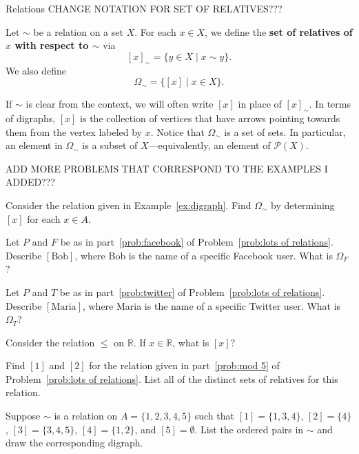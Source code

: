 \begin{section}{Relations}
CHANGE NOTATION FOR SET OF RELATIVES???

\begin{definition}\label{def:relatives}
Let $\sim$ be a relation on a set $X$. For each $x\in X$, we define the \textbf{set of relatives of $x$ with respect to $\sim$} via
\[
[x]_{\sim}=\{y\in X\mid x\sim y\}.
\]
We also define
\[
\Omega_{\sim}=\{[x]\mid x\in X\}.
\]
\end{definition}

If $\sim$ is clear from the context, we will often write $[x]$ in place of $[x]_{\sim}$.  In terms of digraphs, $[x]$ is the collection of vertices that have arrows pointing towards them from the vertex labeled by $x$. Notice that $\Omega_{\sim}$ is a set of sets.  In particular, an element in $\Omega_{\sim}$ is a subset of $X$---equivalently, an element of $\mathcal{P}(X)$.

ADD MORE PROBLEMS THAT CORRESPOND TO THE EXAMPLES I ADDED???

\begin{problem}
Consider the relation given in Example~\ref{ex:digraph}. Find $\Omega_{\sim}$ by determining $[x]$ for each $x\in A$.
\end{problem}

\begin{problem}
Let $P$ and $F$ be as in part~\ref{prob:facebook} of Problem~\ref{prob:lots of relations}.  Describe $[\text{Bob}]$, where Bob is the name of a specific Facebook user.  What is $\Omega_F$?
\end{problem}

\begin{problem}
Let $P$ and $T$ be as in part~\ref{prob:twitter} of Problem~\ref{prob:lots of relations}.  Describe $[\text{Maria}]$, where Maria is the name of a specific Twitter user.  What is $\Omega_T$?
\end{problem}

\begin{problem}
Consider the relation $\leq$ on $\mathbb{R}$.  If $x\in \mathbb{R}$, what is $[x]$?
\end{problem}

\begin{problem}\label{prob:mod5classes}
Find $[1]$ and $[2]$ for the relation given in part~\ref{prob:mod 5} of Problem~\ref{prob:lots of relations}.  List all of the distinct sets of relatives for this relation.
\end{problem}

\begin{problem}\label{prob:find sim from Omega}
Suppose $\sim$ is a relation on $A=\{1,2,3,4,5\}$ such that $[1]=\{1,3,4\}$, $[2]=\{4\}$, $[3]=\{3,4,5\}$, $[4]=\{1,2\}$, and $[5]=\emptyset$. List the ordered pairs in $\sim$ and draw the corresponding digraph.
\end{problem}

\end{section}